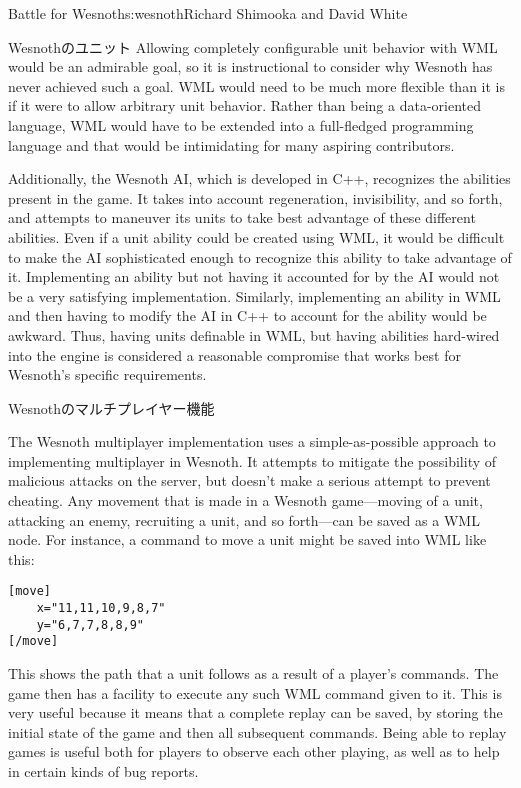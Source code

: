 \begin{aosachapter}{Battle for Wesnoth}{s:wesnoth}{Richard Shimooka and David White}
\begin{aosasect1}{Wesnothのユニット}
Allowing completely configurable unit behavior with WML would be an
admirable goal, so it is instructional to consider why Wesnoth has
never achieved such a goal.  WML would need to be much more flexible
than it is if it were to allow arbitrary unit behavior. Rather than
being a data-oriented language, WML would have to be extended into a
full-fledged programming language and that would be intimidating for
many aspiring contributors.

Additionally, the Wesnoth AI, which is developed in C++, recognizes
the abilities present in the game. It takes into account regeneration,
invisibility, and so forth, and attempts to maneuver its units to take
best advantage of these different abilities. Even if a unit ability
could be created using WML, it would be difficult to make the AI
sophisticated enough to recognize this ability to take advantage of
it.  Implementing an ability but not having it accounted for by the AI
would not be a very satisfying implementation.  Similarly,
implementing an ability in WML and then having to modify the AI in C++
to account for the ability would be awkward. Thus, having units
definable in WML, but having abilities hard-wired into the engine is
considered a reasonable compromise that works best for Wesnoth's
specific requirements.

\end{aosasect1}

\begin{aosasect1}{Wesnothのマルチプレイヤー機能}

The Wesnoth multiplayer implementation uses a simple-as-possible
approach to implementing multiplayer in Wesnoth. It attempts to
mitigate the possibility of malicious attacks on the server, but
doesn't make a serious attempt to prevent cheating.  Any movement that
is made in a Wesnoth game---moving of a unit, attacking an enemy,
recruiting a unit, and so forth---can be saved as a WML node. For
instance, a command to move a unit might be saved into WML like this:

\begin{verbatim}
[move]
    x="11,11,10,9,8,7"
    y="6,7,7,8,8,9"
[/move]
\end{verbatim}

\noindent This shows the path that a unit follows as a result of a player's
commands. The game then has a facility to execute any such WML command
given to it. This is very useful because it means that a complete
replay can be saved, by storing the initial state of the game and then
all subsequent commands. Being able to replay games is useful both for
players to observe each other playing, as well as to help in certain
kinds of bug reports.


\end{aosasect1}
\end{aosachapter}
